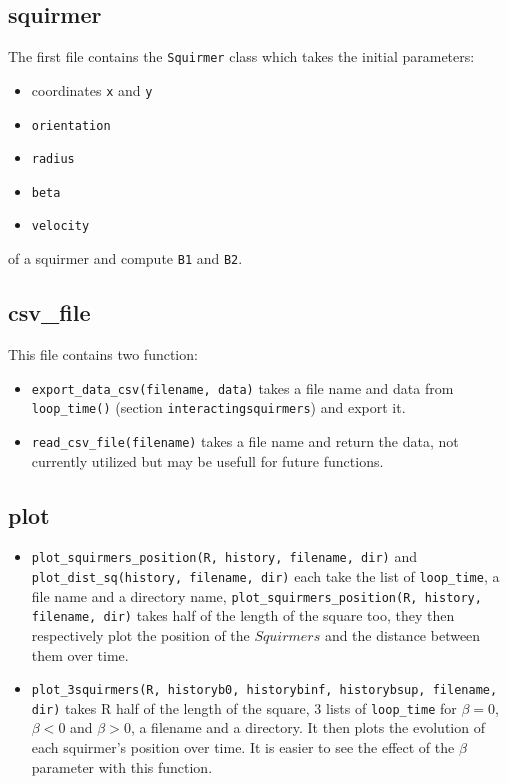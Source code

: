 \documentclass{article}
\begin{document}
\subsection{squirmer}
The first file contains the \texttt{Squirmer} class which takes the initial parameters: 
\begin{itemize}
   \item coordinates \texttt{x} and \texttt{y}
   \item \texttt{orientation}
   \item \texttt{radius}
   \item \texttt{beta}
   \item \texttt{velocity}
\end{itemize}
of a squirmer and compute \texttt{B1} and \texttt{B2}.

\subsection{csv\_file}
This file contains two function:
\begin{itemize}
   \item \texttt{export\_data\_csv(filename, data)} takes a file name and data from \texttt{loop\_time()} (section \texttt{interactingsquirmers}) and export it.
   \item \texttt{read\_csv\_file(filename)} takes a file name and return the data, not currently utilized but may be usefull for future functions.
\end{itemize}

\subsection{plot}
\begin{itemize}
   \item \texttt{plot\_squirmers\_position(R, history, filename, dir)} and \texttt{plot\_dist\_sq(history, filename, dir)} 
   each take the list of \texttt{loop\_time}, a file name and a directory name, \texttt{plot\_squirmers\_position(R, history, filename, dir)} takes half of the length of the square too,
   they then respectively plot the position of the $Squirmers$ and the distance between them over time.
   \item \texttt{plot\_3squirmers(R, historyb0, historybinf, historybsup, filename, dir)} takes R half of the length of the square, 3 lists
   of \texttt{loop\_time} for $\beta=0$, $\beta<0$ and $\beta>0$, a filename and a directory.
   It then plots the evolution of each squirmer's position over time. It is easier to see the effect of the $\beta$ parameter with this function.
\end{itemize}
\end{document}
